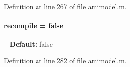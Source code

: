 Definition at line 267 of file amimodel.\+m.

\hypertarget{classamimodel_a8d2e824e03e32034b634a7c48f2a26c6}{}
\paragraph[{recompile}]{\setlength{\rightskip}{0pt plus 5cm}recompile = false}\label{classamimodel_a8d2e824e03e32034b634a7c48f2a26c6}
~\newline
{\bfseries Default\+:} false 

Definition at line 282 of file amimodel.\+m.

